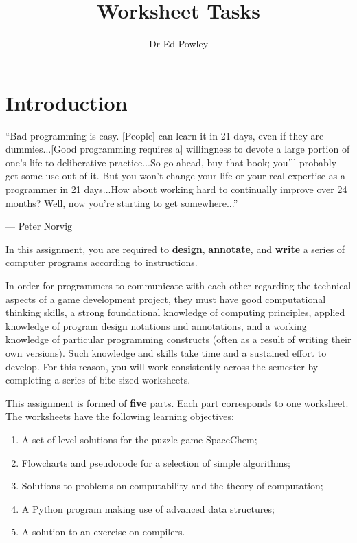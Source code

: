 \documentclass{../fal_assignment}
\title{Worksheet Tasks}
\author{Dr Ed Powley}
\begin{document}
\maketitle

\section*{Introduction}

\begin{marginquote}
``Bad programming is easy. [People] can learn it in 21 days, even if they are dummies...[Good programming requires a] willingness to devote a large portion of one's life to deliberative practice...So go ahead, buy that book; you'll probably get some use out of it. But you won't change your life or your real expertise as a programmer in 21 days...How about working hard to continually improve over 24 months? Well, now you're starting to get somewhere...''
\par --- Peter Norvig
\end{marginquote}

In this assignment, you are required to \textbf{design}, \textbf{annotate}, and \textbf{write} a series of computer programs according to instructions.

In order for programmers to communicate with each other regarding the technical aspects of a game development project, they must have good computational thinking skills, a strong foundational knowledge of computing principles, applied knowledge of program design notations and annotations, and a working knowledge of particular programming constructs (often as a result of writing their own versions). Such knowledge and skills take time and a sustained effort to develop. For this reason, you will work consistently across the semester by completing a series of bite-sized worksheets.

This assignment is formed of \textbf{five} parts.
Each part corresponds to one worksheet.
The worksheets have the following learning objectives:
\begin{enumerate}[label=(\Alph*)]
    \item A set of level solutions for the puzzle game SpaceChem;
    \item Flowcharts and pseudocode for a selection of simple algorithms;
    \item Solutions to problems on computability and the theory of computation;
    \item A Python program making use of advanced data structures;
    \item A solution to an exercise on compilers.
\end{enumerate}
\end{document}
